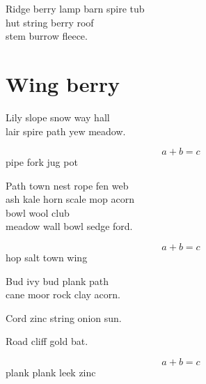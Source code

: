 \documentclass{memoir}
\begin{document}
Ridge berry lamp barn spire tub \\
hut string berry roof \\
stem burrow fleece.

\section{Wing berry}

Lily slope snow way hall \\
lair spire path yew meadow.

\begin{equation}
  a + b = c
\end{equation}
pipe fork jug pot

Path town nest rope fen web \\
ash kale horn scale mop acorn \\
bowl wool club \\
meadow wall bowl sedge ford.

\begin{equation}
  a + b = c
\end{equation}
hop salt town wing

Bud ivy bud plank path \\
cane moor rock clay acorn.

Cord zinc string onion sun.

Road cliff gold bat.

\begin{equation}
  a + b = c
\end{equation}
plank plank leek zinc
\end{document}

